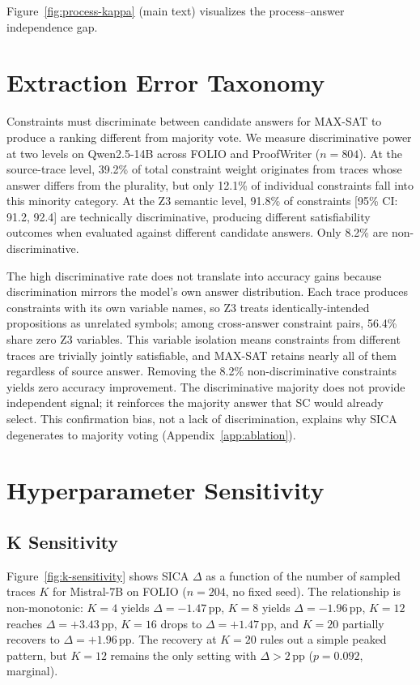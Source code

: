 Figure~\ref{fig:process-kappa} (main text) visualizes the process--answer independence gap.


\section{Extraction Error Taxonomy}
\label{app:extraction}
\label{sec:extraction-taxonomy}

Constraints must discriminate between candidate answers for MAX-SAT to produce a ranking different from majority vote. We measure discriminative power at two levels on Qwen2.5-14B across FOLIO and ProofWriter ($n = 804$). At the source-trace level, 39.2\% of total constraint weight originates from traces whose answer differs from the plurality, but only 12.1\% of individual constraints fall into this minority category. At the Z3 semantic level, 91.8\% of constraints [95\% CI: 91.2, 92.4] are technically discriminative, producing different satisfiability outcomes when evaluated against different candidate answers. Only 8.2\% are non-discriminative.

The high discriminative rate does not translate into accuracy gains because discrimination mirrors the model's own answer distribution. Each trace produces constraints with its own variable names, so Z3 treats identically-intended propositions as unrelated symbols; among cross-answer constraint pairs, 56.4\% share zero Z3 variables. This variable isolation means constraints from different traces are trivially jointly satisfiable, and MAX-SAT retains nearly all of them regardless of source answer. Removing the 8.2\% non-discriminative constraints yields zero accuracy improvement. The discriminative majority does not provide independent signal; it reinforces the majority answer that SC would already select. This confirmation bias, not a lack of discrimination, explains why SICA degenerates to majority voting (Appendix~\ref{app:ablation}).


\section{Hyperparameter Sensitivity}
\label{app:sensitivity}
\label{sec:k-sensitivity}
\label{sec:t-sensitivity}

\subsection{K Sensitivity}

Figure~\ref{fig:k-sensitivity} shows SICA $\Delta$ as a function of the number of sampled traces $K$ for Mistral-7B on FOLIO ($n = 204$, no fixed seed). The relationship is non-monotonic: $K = 4$ yields $\Delta = -1.47$\,pp, $K = 8$ yields $\Delta = -1.96$\,pp, $K = 12$ reaches $\Delta = +3.43$\,pp, $K = 16$ drops to $\Delta = +1.47$\,pp, and $K = 20$ partially recovers to $\Delta = +1.96$\,pp. The recovery at $K = 20$ rules out a simple peaked pattern, but $K = 12$ remains the only setting with $\Delta > 2$\,pp ($p = 0.092$, marginal).

